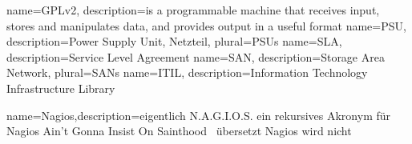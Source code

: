 	{
 	 name=GPLv2,
 	 description={is a programmable machine that receives input,
               stores and manipulates data, and provides
               output in a useful format}
	}
	{
	name=PSU,
	description={Power Supply Unit, Netzteil},
	plural=PSUs
	}
	{
	name=SLA,
	description={Service Level Agreement}
	}
	{
	name=SAN,
	description={Storage Area Network},
	plural=SANs
	}
	{
	name=ITIL,
	description={Information Technology Infrastructure Library}
	}
	
{
	name={Nagios},description={eigentlich N.A.G.I.O.S. ein rekursives Akronym für \glqq Nagios Ain’t Gonna Insist On Sainthood \grqq\ übersetzt \glqq Nagios wird nicht  }}


